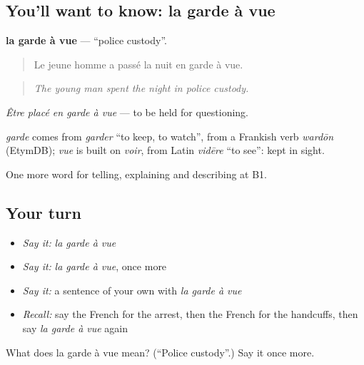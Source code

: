 \subsection*{You'll want to know: la garde à vue}
\textbf{la garde à vue} — \textquotedblleft{}police custody\textquotedblright{}.

\begin{quote}
Le jeune homme a passé la nuit en garde à vue.
\end{quote}

\begin{quote}
\emph{The young man spent the night in police custody.}
\end{quote}

\emph{Être placé en garde à vue} — to be held for questioning.

\begin{cousinweb}
\emph{garde} comes from \emph{garder} \textquotedblleft{}to keep, to watch\textquotedblright{}, from a Frankish verb \emph{wardōn} (EtymDB); \emph{vue} is built on \emph{voir}, from Latin \emph{vidēre} \textquotedblleft{}to see\textquotedblright{}: kept in sight.
\end{cousinweb}

\begin{grammarlens}[title={What you've built}]
One more word for telling, explaining and describing at B1.
\end{grammarlens}

\subsection*{Your turn}
\begin{itemize}
\raggedright
  \item \emph{Say it:} \emph{la garde à vue}
  \item \emph{Say it:} \emph{la garde à vue}, once more
  \item \emph{Say it:} a sentence of your own with \emph{la garde à vue}
  \item \emph{Recall:} say the French for the arrest, then the French for the handcuffs, then say \emph{la garde à vue} again
\end{itemize}

\begin{tcolorbox}[breakable,colback=teal!4,colframe=teal!35!black,title={Before you move on}]
What does la garde à vue mean? (\textquotedblleft{}Police custody\textquotedblright{}.) Say it once more.
\end{tcolorbox}
